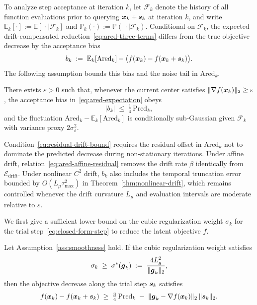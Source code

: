 To analyze step acceptance at iteration $k$, let $\mathcal{F}_k$ denote the history of all function evaluations prior to querying $\boldsymbol{x}_k + \boldsymbol{s}_k$ at iteration $k$, and write $\mathbb{E}_k[\cdot] := \mathbb{E}[\,\cdot \mid \mathcal{F}_k]$ and $\mathbb{P}_k(\cdot) := \mathbb{P}(\,\cdot \mid \mathcal{F}_k)$. Conditional on $\mathcal{F}_k$, the expected drift-compensated reduction~\eqref{eq:ared-three-terms} differs from the true objective decrease by the acceptance bias
\begin{equation}\label{eq:ared-expectation}
  b_k \;:=\; \mathbb{E}_k[\mathrm{Ared}_k]
  - \bigl(f(\boldsymbol{x}_k)-f(\boldsymbol{x}_k+\boldsymbol{s}_k)\bigr).
\end{equation}
The following assumption bounds this bias and the noise tail in $\mathrm{Ared}_k$.

\begin{assumption}
\label{ass:drift-regime}
There exists $\varepsilon > 0$ such that, whenever the current center satisfies $\|\nabla f(\boldsymbol{x}_k)\|_2 \ge \varepsilon$, the acceptance bias in~\eqref{eq:ared-expectation} obeys
\begin{equation}\label{eq:residual-drift-bound}
  |b_k| \;\le\; \tfrac{1}{4}\,\mathrm{Pred}_k,
\end{equation}
and the fluctuation $\mathrm{Ared}_k - \mathbb{E}_k[\mathrm{Ared}_k]$ is conditionally sub-Gaussian given $\mathcal{F}_k$ with variance proxy $2\sigma_\varepsilon^2$.
\end{assumption}

Condition~\eqref{eq:residual-drift-bound} requires the residual offset in $\mathrm{Ared}_k$ not to dominate the predicted decrease during non-stationary iterations. Under affine drift, relation~\eqref{eq:ared-affine-residual} removes the drift rate $\beta$ identically from $\mathcal{E}_{\mathrm{drift}}$. Under nonlinear $C^2$ drift, $b_k$ also includes the temporal truncation error bounded by $O(L_\mu \tau_{\max}^2)$ in Theorem~\ref{thm:nonlinear-drift}, which remains controlled whenever the drift curvature $L_\mu$ and evaluation intervals are moderate relative to $\varepsilon$.

We first give a sufficient lower bound on the cubic regularization weight $\sigma_k$ for the trial step~\eqref{eq:closed-form-step} to reduce the latent objective $f$.

\begin{lemma}
\label{lem:reliable-sigma}
Let Assumption~\ref{ass:smoothness} hold. If the cubic regularization weight satisfies
\begin{equation}\label{eq:sigma-threshold}
  \sigma_k \;\ge\; \sigma^*(\boldsymbol{g}_k) \;:=\; \frac{4L_g^2}{\|\boldsymbol{g}_k\|_2},
\end{equation}
then the objective decrease along the trial step $\boldsymbol{s}_k$ satisfies
\begin{equation}\label{eq:true-decrease-bound}
  f(\boldsymbol{x}_k) - f(\boldsymbol{x}_k + \boldsymbol{s}_k) \;\ge\; \tfrac{3}{4}\,\mathrm{Pred}_k \;-\; \|\boldsymbol{g}_k - \nabla f(\boldsymbol{x}_k)\|_2\,\|\boldsymbol{s}_k\|_2.
\end{equation}
\end{lemma}

